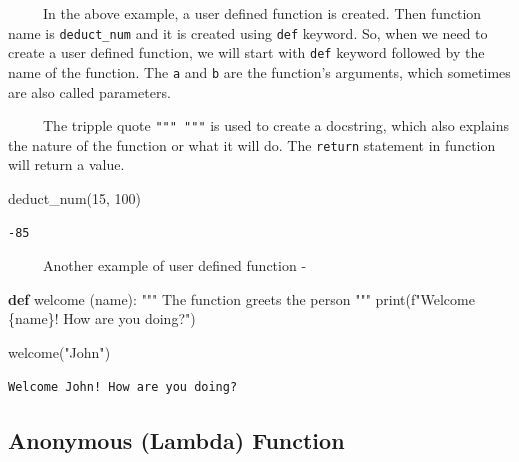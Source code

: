 \documentclass[
  letterpaper,
  DIV=11,
  numbers=noendperiod]{scrreprt}
\newenvironment{Shaded}{\begin{snugshade}}{\end{snugshade}}
\newcommand{\BuiltInTok}[1]{\textcolor[rgb]{0.00,0.23,0.31}{#1}}
\newcommand{\CommentTok}[1]{\textcolor[rgb]{0.37,0.37,0.37}{#1}}
\newcommand{\DecValTok}[1]{\textcolor[rgb]{0.68,0.00,0.00}{#1}}
\newcommand{\KeywordTok}[1]{\textcolor[rgb]{0.00,0.23,0.31}{\textbf{#1}}}
\newcommand{\NormalTok}[1]{\textcolor[rgb]{0.00,0.23,0.31}{#1}}
\newcommand{\SpecialCharTok}[1]{\textcolor[rgb]{0.37,0.37,0.37}{#1}}
\newcommand{\SpecialStringTok}[1]{\textcolor[rgb]{0.13,0.47,0.30}{#1}}
\newcommand{\StringTok}[1]{\textcolor[rgb]{0.13,0.47,0.30}{#1}}
\begin{document}
~~~~~In the above example, a user defined function is created. Then
function name is \texttt{deduct\_num} and it is created using
\texttt{def} keyword. So, when we need to create a user defined
function, we will start with \texttt{def} keyword followed by the name
of the function. The \texttt{a} and \texttt{b} are the function's
arguments, which sometimes are also called parameters.

~~~~~The tripple quote \texttt{"""\ """} is used to create a docstring,
which also explains the nature of the function or what it will do. The
\texttt{return} statement in function will return a value.

\begin{Shaded}
\begin{Highlighting}[]
\NormalTok{deduct\_num(}\DecValTok{15}\NormalTok{, }\DecValTok{100}\NormalTok{)}
\end{Highlighting}
\end{Shaded}

\begin{verbatim}
-85
\end{verbatim}

~~~~~Another example of user defined function -

\begin{Shaded}
\begin{Highlighting}[]
\KeywordTok{def}\NormalTok{ welcome (name):}
  \CommentTok{"""}
\CommentTok{  The function greets the person}
\CommentTok{  """}
  \BuiltInTok{print}\NormalTok{(}\SpecialStringTok{f"Welcome }\SpecialCharTok{\{}\NormalTok{name}\SpecialCharTok{\}}\SpecialStringTok{! How are you doing?"}\NormalTok{)}
\end{Highlighting}
\end{Shaded}

\begin{Shaded}
\begin{Highlighting}[]
\NormalTok{welcome(}\StringTok{"John"}\NormalTok{)}
\end{Highlighting}
\end{Shaded}

\begin{verbatim}
Welcome John! How are you doing?
\end{verbatim}

\subsection{Anonymous (Lambda)
Function}\label{anonymous-lambda-function}
\end{document}
